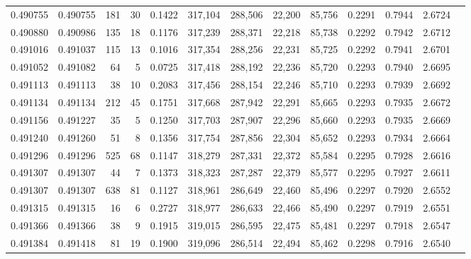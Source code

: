 \begin{tabular}{rrrrrrrrrrrrr}
0.490755 & 0.490755 &   181 &    30 &                                     0.1422 & 317,104 & 288,506 &  22,200 &  85,756 & 0.2291 & 0.7944 & 2.6724 \\
0.490880 & 0.490986 &   135 &    18 &                                     0.1176 & 317,239 & 288,371 &  22,218 &  85,738 & 0.2292 & 0.7942 & 2.6712 \\
0.491016 & 0.491037 &   115 &    13 &                                     0.1016 & 317,354 & 288,256 &  22,231 &  85,725 & 0.2292 & 0.7941 & 2.6701 \\
0.491052 & 0.491082 &    64 &     5 &                                     0.0725 & 317,418 & 288,192 &  22,236 &  85,720 & 0.2293 & 0.7940 & 2.6695 \\
0.491113 & 0.491113 &    38 &    10 &                                     0.2083 & 317,456 & 288,154 &  22,246 &  85,710 & 0.2293 & 0.7939 & 2.6692 \\
0.491134 & 0.491134 &   212 &    45 &                                     0.1751 & 317,668 & 287,942 &  22,291 &  85,665 & 0.2293 & 0.7935 & 2.6672 \\
0.491156 & 0.491227 &    35 &     5 &                                     0.1250 & 317,703 & 287,907 &  22,296 &  85,660 & 0.2293 & 0.7935 & 2.6669 \\
0.491240 & 0.491260 &    51 &     8 &                                     0.1356 & 317,754 & 287,856 &  22,304 &  85,652 & 0.2293 & 0.7934 & 2.6664 \\
0.491296 & 0.491296 &   525 &    68 &                                     0.1147 & 318,279 & 287,331 &  22,372 &  85,584 & 0.2295 & 0.7928 & 2.6616 \\
0.491307 & 0.491307 &    44 &     7 &                                     0.1373 & 318,323 & 287,287 &  22,379 &  85,577 & 0.2295 & 0.7927 & 2.6611 \\
0.491307 & 0.491307 &   638 &    81 &                                     0.1127 & 318,961 & 286,649 &  22,460 &  85,496 & 0.2297 & 0.7920 & 2.6552 \\
0.491315 & 0.491315 &    16 &     6 &                                     0.2727 & 318,977 & 286,633 &  22,466 &  85,490 & 0.2297 & 0.7919 & 2.6551 \\
0.491366 & 0.491366 &    38 &     9 &                                     0.1915 & 319,015 & 286,595 &  22,475 &  85,481 & 0.2297 & 0.7918 & 2.6547 \\
0.491384 & 0.491418 &    81 &    19 &                                     0.1900 & 319,096 & 286,514 &  22,494 &  85,462 & 0.2298 & 0.7916 & 2.6540 \\

\end{tabular}
